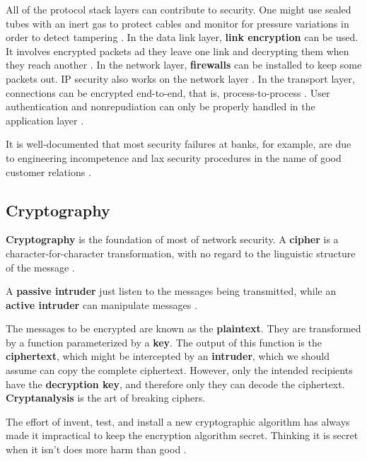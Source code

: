 \documentclass[12pt, oneside]{book}
\begin{document}
All of the protocol stack layers can contribute to security. One might use sealed tubes with an inert gas to protect cables and monitor for pressure variations in order to detect tampering \cite[p.~765]{computer-networks-tanenbaum-2012}. In the data link layer, \textbf{link encryption} can be used. It involves encrypted packets ad they leave one link and decrypting them when they reach another \cite[p.~765]{computer-networks-tanenbaum-2012}.
In the network layer, \textbf{firewalls} can be installed to keep some packets out. IP security also works on the network layer \cite[p.~765]{computer-networks-tanenbaum-2012}.
In the transport layer, connections can be encrypted end-to-end, that is, process-to-process \cite[p.~765]{computer-networks-tanenbaum-2012}.
User authentication and nonrepudiation can only be properly handled in the application layer \cite[p.~765]{computer-networks-tanenbaum-2012}.

It is well-documented that most security failures at banks, for example, are due to engineering incompetence and lax security procedures in the name of good customer relations \cite[p.~765]{computer-networks-tanenbaum-2012}.

\subsection{Cryptography}

\textbf{Cryptography} is the foundation of most of network security.
A \textbf{cipher} is a character-for-character transformation, with no regard to the linguistic structure of the message \cite[p.~766]{computer-networks-tanenbaum-2012}.

A \textbf{passive intruder} just listen to the messages being transmitted, while an \textbf{active intruder} can manipulate messages \cite[p.~767]{computer-networks-tanenbaum-2012}.

The messages to be encrypted are known as the \textbf{plaintext}. They are transformed by a function parameterized by a \textbf{key}.
The output of this function is the \textbf{ciphertext}, which might be intercepted by an \textbf{intruder}, which we should assume can copy the complete ciphertext.
However, only the intended recipients have the \textbf{decryption key}, and therefore only they can decode the ciphertext.
\textbf{Cryptanalysis} is the art of breaking ciphers.

The effort of invent, test, and install a new cryptographic algorithm has always made it impractical to keep the encryption algorithm secret.
Thinking it is secret when it isn't does more harm than good \cite[p.~768]{computer-networks-tanenbaum-2012}.
\end{document}
